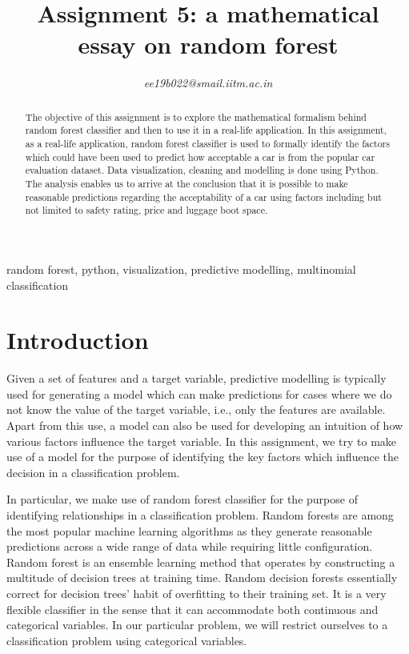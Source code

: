 \documentclass[conference]{IEEEtran}
\begin{document}
\title{Assignment 5: a mathematical essay on random forest\\}


\author{
\textit{ee19b022@smail.iitm.ac.in}

}

\maketitle

\begin{abstract}
The objective of this assignment is to explore the mathematical formalism behind random forest classifier and then to use it in a real-life application. In this assignment, as a real-life application, random forest classifier is used to formally identify the factors which could have been used to predict how acceptable a car is from the popular car evaluation dataset. Data visualization, cleaning and modelling is done using Python. The analysis enables us to arrive at the conclusion that it is possible to make reasonable predictions regarding the acceptability of a car using factors including but not limited to safety rating, price and luggage boot space. 
\end{abstract}

\begin{IEEEkeywords}
random forest, python, visualization, predictive modelling, multinomial classification
\end{IEEEkeywords}

\section{Introduction}

Given a set of features and a target variable, predictive modelling is typically used for generating a model which can make predictions for cases where we do not know the value of the target variable, i.e., only the features are available. Apart from this use, a model can also be used for developing an intuition of how various factors influence the target variable. In this assignment, we try to make use of a model for the purpose of identifying the key factors which influence the decision in a classification problem.

In particular, we make use of random forest classifier for the purpose of identifying relationships in a classification problem. Random forests are among the most popular machine learning algorithms as they generate reasonable predictions across a wide range of data while requiring little configuration. Random forest is an ensemble learning method that operates by constructing a multitude of decision trees at training time. Random decision forests essentially correct for decision trees' habit of overfitting to their training set. It is a very flexible classifier in the sense that it can accommodate both continuous and categorical variables. In our particular problem, we will restrict ourselves to a classification problem using categorical variables.
\end{document}
